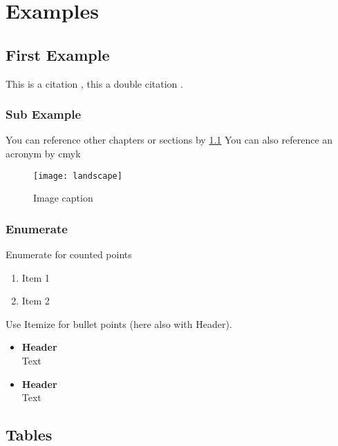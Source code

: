 \documentclass[../main]{subfiles}
\begin{document}
\chapter{Examples}
\label{chap:examples}

\section{First Example}
\label{chap:first_example}
This is a citation \cite{buch}, this a double citation \cite{buch, buch}.

\subsection{Sub Example}
\label{chap:second_example}

You can reference other chapters or sections by \ref{chap:first_example} 
You can also reference an acronym by \ac{cmyk}


\vspace{5mm}
\begin{figure}[htbp]
	\centering
	\begin{minipage}{0.7\linewidth}
	\texttt{[image: landscape]}
	\end{minipage}
	\caption{Image caption \cite[S.~5]{buch}}
	\label{img:example_img}
\end{figure}

\subsection{Enumerate}

Enumerate for counted points
\begin{enumerate}
	\item Item 1
	\item Item 2
\end{enumerate}

Use Itemize for bullet points (here also with Header).
\begin{itemize}
	\item \textbf{Header} \\
	Text
	
	\item \textbf{Header} \\
	Text
\end{itemize}

\section{Tables}
\end{document}
